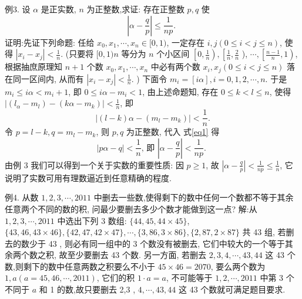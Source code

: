 例3. 设 $\alpha$ 是正实数, $n$ 为正整数,求证: 存在正整数 $p, q$ 使
$$
\left|\alpha-\frac{q}{p}\right| \leqslant \frac{1}{n p} \text {. }
$$
证明:先证下列命题:
任给 $x_0, x_1, \cdots, x_n \in[0,1)$, 一定存在 $i, j(0 \leqslant i<j \leqslant n)$, 使得 $\left|x_i-x_j\right|<\frac{1}{n}$. (只要将 $[0,1) n$ 等分为 $n$ 个小区间 $\left[0, \frac{1}{n}\right),\left[\frac{1}{n}, \frac{2}{n}\right.$ ), $\cdots,\left[\frac{n-1}{n}, 1\right)$, 根据抽庶原理知 $n+1$ 个数 $x_0, x_1, \cdots, x_n$ 中必有两个数 $x_i, x_j(0 \leqslant i<j \leqslant n)$ 落在同一区间内, 从而有 $\left|x_i-x_j\right|<\frac{1}{n}$. )
下面令 $m_i=[i \alpha], i=0,1,2, \cdots, n$. 于是 $m_i \leqslant i \alpha<m_i+1$, 即 $0 \leqslant i \alpha- m_i<1$, 由上述命题知, 存在 $0 \leqslant k<l \leqslant n$, 使得 $\left|\left(l_\alpha-m_l\right)-\left(k \alpha-m_k\right)\right|<\frac{1}{n}$, 即
$$
\left|(l-k) \alpha-\left(m_l-m_k\right)\right|<\frac{1}{n} . \label{eq1}
$$
令 $p=l-k, q=m_l-m_k$, 则 $p, q$ 为正整数, 代入 式\ref{eq1} 得
$$
|p \alpha-q|<\frac{1}{n} \text {, 即 }\left|\alpha-\frac{q}{p}\right|<\frac{1}{n p} \text {. }
$$
由例 3 我们可以得到一个关于实数的重要性质: 因 $p \geqslant 1$, 故 $\left|\alpha-\frac{q}{p}\right|< \frac{1}{n p} \leqslant \frac{1}{n}$, 它说明了实数可用有理数逼近到任意精确的程度.



例4. 从数 $1,2,3, \cdots, 2011$ 中删去一些数,使得剩下的数中任何一个数都不等于其余任意两个不同的数的积, 问最少要删去多少个数才能做到这一点?
解:从 $1,2,3, \cdots, 2011$ 中选出下列 3 数组: $\{44,45,44 \times 45\}$, $\{43,46,43 \times 46\},\{42,47,42 \times 47\}, \cdots,\{3,86,3 \times 86\},\{2,87,2 \times 87\}$ 共 43 组, 若删去的数少于 43 , 则必有同一组中的 3 个数没有被删去, 它们中较大的一个等于其余两个数之积, 故至少要删去 43 个数.
另一方面, 若删去 $2,3,4, \cdots, 43,44$ 这 43 个数,则剩下的数中任意两数之积要么不小于 $45 \times 46=2070$, 要么两个数为 $1, a(a=45,46, \cdots, 2011)$, 它们的积 $1 \cdot a=a$, 不可能等于 $1,2, \cdots, 2011$ 中第 3 个不同于 $a$ 和 1 的数,故只要删去 2,3 , $4, \cdots, 43,44$ 这 43 个数就可满足题目要求.



